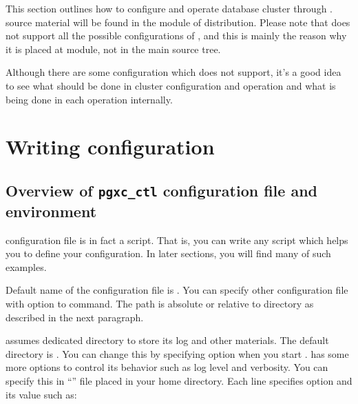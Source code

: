 %
%


  This section outlines how to configure and operate \XC{} database cluster through .
   source material will be found in the  module of \XC{} distribution.
  Please note that  does not support all the possible configurations of \XC,
  and this is mainly the reason why it is placed at  module, not in the main source tree.
  
  Although there are some configuration which  does not support, it's a good idea
  to see what should be done in \XC{} cluster configuration and operation and what is being done in
  each operation internally.




\chapter{Writing configuration}



\section{Overview of \texttt{pgxc\_ctl} configuration file and environment}

   configuration file is in fact a  script.
  That is, you can write any  script which helps you to define your \XC{} configuration.
  In later sections, you will find many of such examples.
  
  Default name of the configuration file is .
  You can specify other configuration file with  option to  command.
  The path is absolute or relative to  directory as described in the next paragraph.
  
   assumes dedicated directory to store its log and other materials.
  The default directory is .
  You can change this by specifying  option when you start .
   has some more options to control its behavior such as log level and verbosity.
  You can specify this in ``'' file placed in your home directory.
  Each line specifies option and its value such as:
  
